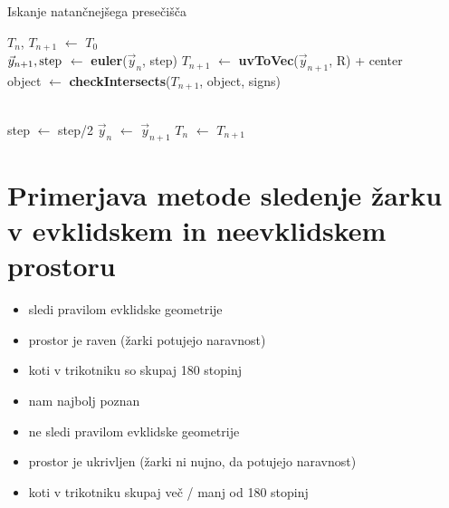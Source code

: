 \documentclass[titlepage]{article}
\begin{document}
\begin{algorithm}[H]
    \caption{Iskanje natančnejšega presečišča}
\begin{algorithmic}

    \State $T_{n}$, $T_{n+1}$ $\gets$ $T_{0}$
    \\
      \State {}
    \EndIf
    \State $\vec{y}_{n+1}, \hbox{step}$ $\gets$ \textbf{euler}($\vec{y}_{n}$, step)
    \State $T_{n+1}$ $\gets$ \textbf{uvToVec}($\vec{y}_{n+1}$, R) + center
    \\
    \State object $\gets$ \textbf{checkIntersects}($T_{n+1}$, object, signs)
    \\
    \\

        \State step $\gets$ step/2
    \Else
      \State $\vec{y}_{n}$ $\gets$ $\vec{y}_{n+1}$
      \State $T_{n}$ $\gets$ $T_{n+1}$
    \EndIf
  \EndWhile
\EndFunction
\end{algorithmic}
\end{algorithm}

\section {Primerjava metode sledenje žarku v evklidskem in neevklidskem prostoru}


\begin{itemize}
\item sledi pravilom evklidske geometrije
\item prostor je raven (žarki potujejo naravnost)
\item koti v trikotniku so skupaj 180 stopinj
\item nam najbolj poznan
\end{itemize}

\begin{itemize}
\item ne sledi pravilom evklidske geometrije
\item prostor je ukrivljen (žarki ni nujno, da potujejo naravnost)
\item koti v trikotniku skupaj več / manj od  180 stopinj
\end{itemize}
\end{document}
